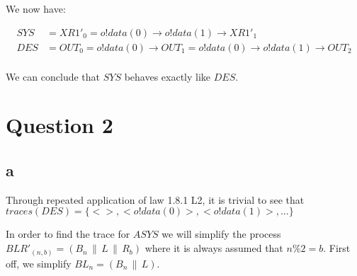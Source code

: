 \documentclass[a4paper, 10pt]{article}
\newcommand{\conc}{\, \| \,}
\begin{document}
We now have:

\begin{align*}
  SYS &= XR1'_0 = o!data(0) \to o!data(1) \to XR1'_{1} \\
  DES &= OUT_0 = o!data(0) \to OUT_{1} = o!data(0) \to o!data(1) \to OUT_{2} \\
\end{align*}

We can conclude that $SYS$ behaves exactly like $DES$.

\section{Question 2}

\subsection{a}

Through repeated application of law 1.8.1 L2, it is trivial to see
that $traces(DES) = \{<>, <o!data(0)>, <o!data(1)>, ...\}$

In order to find the trace for $ASYS$ we will simplify the process
$BLR'_{(n,b)} = (B_n \conc L \conc R_b)$ where it is always assumed
that $n\%2 = b$.
First off, we simplify $BL_n = (B_n \conc L)$.
\end{document}
